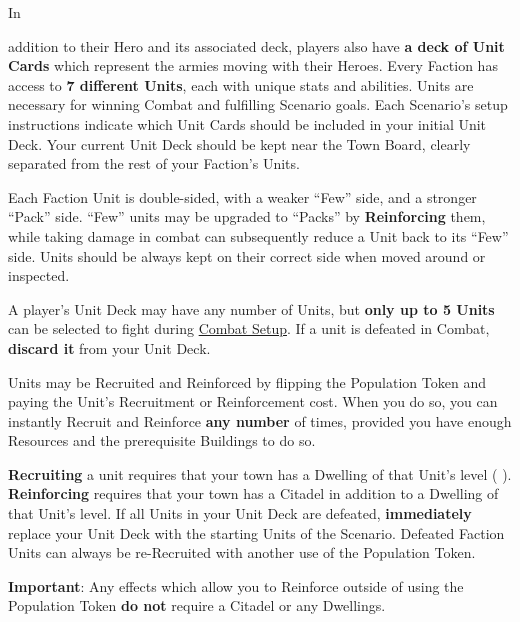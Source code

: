 
\begin{multicols*}{2}

\hypertarget{Units}{In} addition to their Hero and its associated deck, players also have \textbf{a deck of Unit Cards} which represent the armies moving with their Heroes.
Every Faction has access to \textbf{7 different Units}, each with unique stats and abilities.
Units are necessary for winning Combat and fulfilling Scenario goals.
Each Scenario's setup instructions indicate which Unit Cards should be included in your initial Unit Deck.
Your current Unit Deck should be kept near the Town Board, clearly separated from the rest of your Faction's Units.\par
Each Faction Unit is double-sided, with a weaker “Few” side, and a stronger “Pack” side.
“Few” units may be upgraded to “Packs” by \textbf{Reinforcing} them, while taking damage in combat can subsequently reduce a Unit back to its “Few” side.
Units should be always kept on their correct side when moved around or inspected.\par
A player's Unit Deck may have any number of Units, but \textbf{only up to 5 Units} can be selected to fight during \hyperlink{Combatsetup}{Combat Setup}.
If a unit is defeated in Combat, \textbf{discard it} from your Unit Deck.\par
Units may be Recruited and Reinforced by flipping the Population Token and paying the Unit's Recruitment  or Reinforcement  cost.
When you do so, you can instantly Recruit and Reinforce \textbf{any number} of times, provided you have enough Resources and the prerequisite Buildings to do so.\par

\textbf{Recruiting} a unit requires that your town has a Dwelling of that Unit's level ( ).
\textbf{Reinforcing} requires that your town has a Citadel in addition to a Dwelling of that Unit's level.
If all Units in your Unit Deck are defeated, \textbf{immediately} replace your Unit Deck with the starting Units of the Scenario. Defeated Faction Units can always be re-Recruited with another use of the Population Token.\par

\textbf{Important}: Any effects which allow you to Reinforce outside of using the Population Token \textbf{do not} require a Citadel or any Dwellings.


\end{multicols*}
